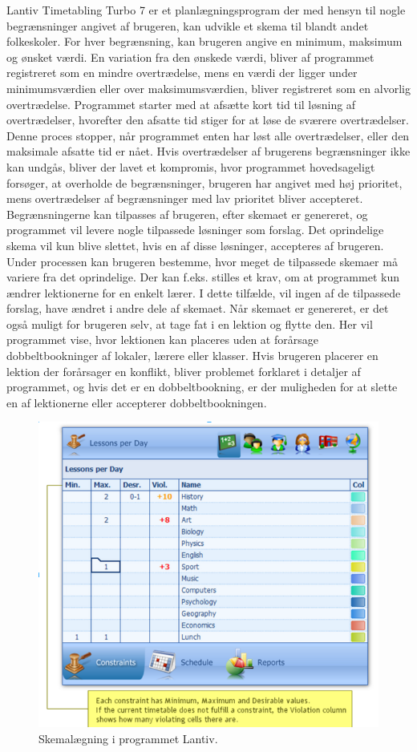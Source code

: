 Lantiv Timetabling Turbo 7 er et planlægningsprogram der med hensyn til nogle begrænsninger angivet af brugeren, kan udvikle et skema til blandt andet folkeskoler. For hver begrænsning, kan brugeren angive en minimum, maksimum og ønsket værdi. En variation fra den ønskede værdi, bliver af programmet registreret som en mindre overtrædelse, mens en værdi der ligger under minimumsværdien eller over maksimumsværdien, bliver registreret som en alvorlig overtrædelse. Programmet starter med at afsætte kort tid til løsning af overtrædelser, hvorefter den afsatte tid stiger for at løse de sværere overtrædelser. Denne proces stopper, når programmet enten har løst alle overtrædelser, eller den maksimale afsatte tid er nået. Hvis overtrædelser af brugerens begrænsninger ikke kan undgås, bliver der lavet et kompromis, hvor programmet hovedsageligt forsøger, at overholde de begrænsninger, brugeren har angivet med høj prioritet, mens overtrædelser af begrænsninger med lav prioritet bliver accepteret. Begrænsningerne kan tilpasses af brugeren, efter skemaet er genereret, og programmet vil levere nogle tilpassede løsninger som forslag. Det oprindelige skema vil kun blive slettet, hvis en af disse løsninger, accepteres af brugeren. Under processen kan brugeren bestemme, hvor meget de tilpassede skemaer må variere fra det oprindelige. Der kan f.eks. stilles et krav, om at programmet kun ændrer lektionerne for en enkelt lærer. I dette tilfælde, vil ingen af de tilpassede forslag, have ændret i andre dele af skemaet. Når skemaet er genereret, er det også muligt for brugeren selv, at tage fat i en lektion og flytte den. Her vil programmet vise, hvor lektionen kan placeres uden at forårsage dobbeltbookninger af lokaler, lærere eller klasser. Hvis brugeren placerer en lektion der forårsager en konflikt, bliver problemet forklaret i detaljer af programmet, og hvis det er en dobbeltbookning, er der muligheden for at slette en af lektionerne eller accepterer dobbeltbookningen\cite{lantiv2016}.
\begin{figure}[h]
  \centering
  \includegraphics[scale = 0.9]{partials/graphics/lantiv.png}
  \caption{Skemalægning i programmet Lantiv\cite{lantiv2016}.}
  \label{fig:lantiv}
\end{figure}


